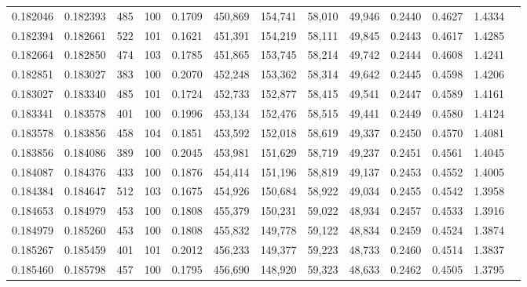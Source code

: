 \begin{tabular}{rrrrrrrrrrrrr}
0.182046 & 0.182393 &   485 & 100 &                                     0.1709 & 450,869 & 154,741 &  58,010 &  49,946 & 0.2440 & 0.4627 & 1.4334 \\
0.182394 & 0.182661 &   522 & 101 &                                     0.1621 & 451,391 & 154,219 &  58,111 &  49,845 & 0.2443 & 0.4617 & 1.4285 \\
0.182664 & 0.182850 &   474 & 103 &                                     0.1785 & 451,865 & 153,745 &  58,214 &  49,742 & 0.2444 & 0.4608 & 1.4241 \\
0.182851 & 0.183027 &   383 & 100 &                                     0.2070 & 452,248 & 153,362 &  58,314 &  49,642 & 0.2445 & 0.4598 & 1.4206 \\
0.183027 & 0.183340 &   485 & 101 &                                     0.1724 & 452,733 & 152,877 &  58,415 &  49,541 & 0.2447 & 0.4589 & 1.4161 \\
0.183341 & 0.183578 &   401 & 100 &                                     0.1996 & 453,134 & 152,476 &  58,515 &  49,441 & 0.2449 & 0.4580 & 1.4124 \\
0.183578 & 0.183856 &   458 & 104 &                                     0.1851 & 453,592 & 152,018 &  58,619 &  49,337 & 0.2450 & 0.4570 & 1.4081 \\
0.183856 & 0.184086 &   389 & 100 &                                     0.2045 & 453,981 & 151,629 &  58,719 &  49,237 & 0.2451 & 0.4561 & 1.4045 \\
0.184087 & 0.184376 &   433 & 100 &                                     0.1876 & 454,414 & 151,196 &  58,819 &  49,137 & 0.2453 & 0.4552 & 1.4005 \\
0.184384 & 0.184647 &   512 & 103 &                                     0.1675 & 454,926 & 150,684 &  58,922 &  49,034 & 0.2455 & 0.4542 & 1.3958 \\
0.184653 & 0.184979 &   453 & 100 &                                     0.1808 & 455,379 & 150,231 &  59,022 &  48,934 & 0.2457 & 0.4533 & 1.3916 \\
0.184979 & 0.185260 &   453 & 100 &                                     0.1808 & 455,832 & 149,778 &  59,122 &  48,834 & 0.2459 & 0.4524 & 1.3874 \\
0.185267 & 0.185459 &   401 & 101 &                                     0.2012 & 456,233 & 149,377 &  59,223 &  48,733 & 0.2460 & 0.4514 & 1.3837 \\
0.185460 & 0.185798 &   457 & 100 &                                     0.1795 & 456,690 & 148,920 &  59,323 &  48,633 & 0.2462 & 0.4505 & 1.3795 \\

\end{tabular}
